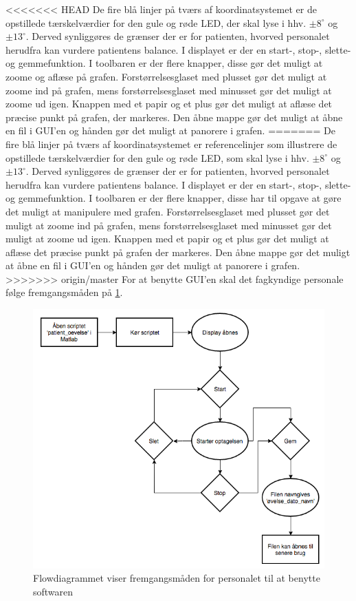 <<<<<<< HEAD
De fire blå linjer på tværs af koordinatsystemet er de opstillede tærskelværdier for den gule og røde LED, der skal lyse i hhv. $\pm 8^{\circ}$ og $\pm 13^{\circ}$. Derved synliggøres de grænser der er for patienten, hvorved personalet herudfra kan vurdere patientens balance. I displayet er der en start-, stop-, slette- og gemmefunktion.
I toolbaren er der flere knapper, disse gør det muligt at zoome og aflæse på grafen. Forstørrelsesglaset med plusset gør det muligt at zoome ind på grafen, mens forstørrelsesglaset med minusset gør det muligt at zoome ud igen. Knappen med et papir og et plus gør det muligt at aflæse det præcise punkt på grafen, der markeres. Den åbne mappe gør det muligt at åbne en fil i GUI'en og hånden gør det muligt at panorere i grafen.
=======
De fire blå linjer på tværs af koordinatsystemet er referencelinjer som illustrere de opstillede tærskelværdier for den gule og røde LED, som skal lyse i hhv. $\pm 8^{\circ}$ og $\pm 13^{\circ}$. Derved synliggøres de grænser der er for patienten, hvorved personalet herudfra kan vurdere patientens balance. I displayet er der en start-, stop-, slette- og gemmefunktion.
I toolbaren er der flere knapper, disse har til opgave at gøre det muligt at manipulere med grafen. Forstørrelsesglaset med plusset gør det muligt at zoome ind på grafen, mens forstørrelsesglaset med minusset gør det muligt at zoome ud igen. Knappen med et papir og et plus gør det muligt at aflæse det præcise punkt på grafen der markeres. Den åbne mappe gør det muligt at åbne en fil i GUI'en og hånden gør det muligt at panorere i grafen.
>>>>>>> origin/master
For at benytte GUI'en skal det fagkyndige personale følge fremgangsmåden på \ref{Fig:fremgangsmåde_software}.
\begin{figure}[H] 
	\centering 
	\includegraphics[scale=0.5]{figures/cProblemloesning/Software_flowdiagram.PNG}
	\caption{Flowdiagrammet viser fremgangsmåden for personalet til at benytte softwaren}
	\label{Fig:fremgangsmåde_software}
\end{figure}

